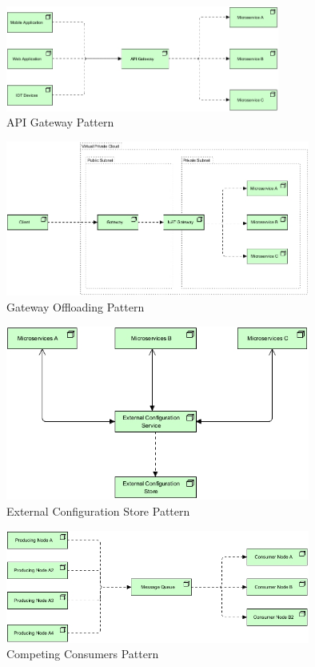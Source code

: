 \documentclass{bmcart}
\begin{document}
\begin{backmatter}
\begin{figure}[h]
  \includegraphics[width=9cm]{Media/API Gateway.jpg}
  \caption{API Gateway Pattern}
  \label{APIGATEWAY}
\end{figure}

\begin{figure}[h]
  \includegraphics[width=10cm]{Media/Gateway Offloading.jpg}
  \caption{Gateway Offloading Pattern}
  \label{gatewayOffloading}
\end{figure}

\begin{figure}[h]
  \includegraphics[width=10cm]{Media/External Configuration Store.jpg}
  \caption{External Configuration Store Pattern}
  \label{externalConfiguration}
\end{figure}

\begin{figure}[h]
  \includegraphics[width=10cm]{Media/Competing Consumers.jpg}
  \caption{Competing Consumers Pattern}
  \label{competingConsumer}
\end{figure}


\end{backmatter}
\end{document}
